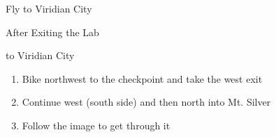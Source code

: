 \begin{paracol}{2}
\switchcolumn
\begin{story}{Fly to Viridian City}
	\varwb
	\varwe
\end{story}

\switchcolumn
\begin{menu}{After Exiting the Lab}
	\varwb
	\begin{packMenu}
		\item \maxRepel
	\end{packMenu}
	\begin{pokeMenu}
		\item {} \fly{} to Viridian City \menuHlTwo{(2\pointUp)}
	\end{pokeMenu}
	\varwe
\end{menu}

\begin{enumerate}[resume]
	\item Bike northwest to the checkpoint and take the west exit
	\item Continue west (south side) and then north into Mt. Silver
	\item Follow the image to get through it
\end{enumerate}


\end{paracol}
